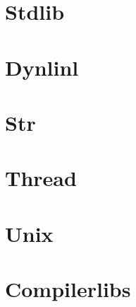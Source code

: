 \documentclass{book}
\begin{document}
\chapter{Stdlib}


\chapter{Dynlinl}

\chapter{Str}

\chapter{Thread}





\chapter{Unix}


\chapter{Compilerlibs}


\end{document}
